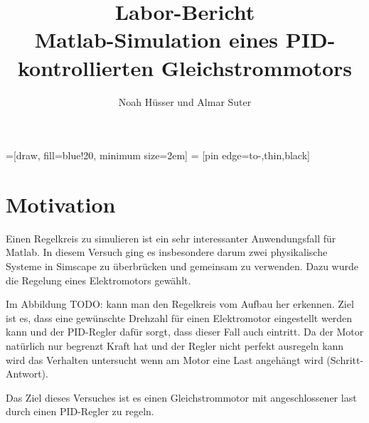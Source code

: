 \documentclass{fhnwreport} %
\title{%
  Labor-Bericht\\[2ex]
  Matlab-Simulation eines PID-kontrollierten Gleichstrommotors}
\author{%
  Noah Hüsser und Almar Suter}
\begin{document}
\maketitle

\vfill

\begin{minipage}{\textwidth}
\begin{center}
\vspace*{5ex}
=[draw, fill=blue!20, minimum size=2em]
 = [pin edge={to-,thin,black}]
\end{center}
\end{minipage}

\vfill

\hbox{}

\clearpage

\tableofcontents

\section{Motivation}

Einen Regelkreis zu simulieren ist ein sehr interessanter Anwendungsfall für Matlab.
In diesem Versuch ging es insbesondere darum zwei physikalische Systeme in Simscape zu überbrücken und gemeinsam zu verwenden.
Dazu wurde die Regelung eines Elektromotors gewählt.

Im Abbildung TODO: kann man den Regelkreis vom Aufbau her erkennen. Ziel ist es, dass eine gewünschte Drehzahl für einen Elektromotor eingestellt werden kann und der PID-Regler dafür sorgt, dass dieser Fall auch eintritt.
Da der Motor natürlich nur begrenzt Kraft hat und der Regler nicht perfekt ausregeln kann wird das Verhalten untersucht wenn am Motor eine Last angehängt wird (Schritt-Antwort).

Das Ziel dieses Versuches ist es einen Gleichstrommotor mit angeschlossener last durch einen PID-Regler zu regeln.
\end{document}
